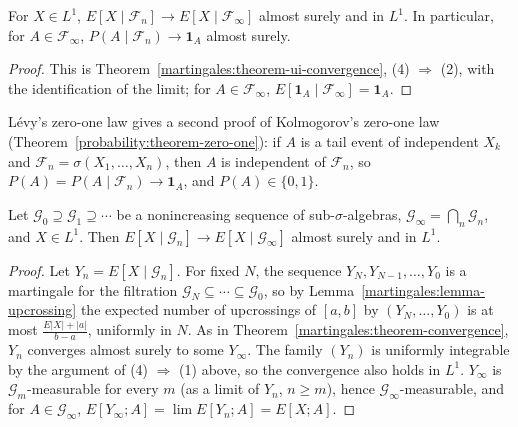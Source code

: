 \begin{corollary}\label{martingales:corollary-levy-upward}
For $X \in L^1$, $E[X \mid \mathcal{F}_n] \to E[X \mid \mathcal{F}_\infty]$ almost surely and in $L^1$. In particular, for $A \in \mathcal{F}_\infty$, $P(A \mid \mathcal{F}_n) \to \mathbf{1}_A$ almost surely.
\end{corollary}

\begin{proof}
This is Theorem~\ref{martingales:theorem-ui-convergence}, (4) $\Rightarrow$ (2), with the identification of the limit; for $A \in \mathcal{F}_\infty$, $E[\mathbf{1}_A \mid \mathcal{F}_\infty] = \mathbf{1}_A$.
\end{proof}

L\'evy's zero-one law gives a second proof of Kolmogorov's zero-one law (Theorem~\ref{probability:theorem-zero-one}): if $A$ is a tail event of independent $X_k$ and $\mathcal{F}_n = \sigma(X_1, \ldots, X_n)$, then $A$ is
independent of $\mathcal{F}_n$, so $P(A) = P(A \mid \mathcal{F}_n) \to \mathbf{1}_A$, and $P(A) \in \{0, 1\}$.

\begin{theorem}\label{martingales:theorem-backward}
Let $\mathcal{G}_0 \supseteq \mathcal{G}_1 \supseteq \cdots$ be a nonincreasing sequence of sub-$\sigma$-algebras, $\mathcal{G}_\infty = \bigcap_n\mathcal{G}_n$, and $X \in L^1$. Then $E[X \mid \mathcal{G}_n] \to E[X \mid \mathcal{G}_\infty]$
almost surely and in $L^1$.
\end{theorem}

\begin{proof}
Let $Y_n = E[X \mid \mathcal{G}_n]$. For fixed $N$, the sequence $Y_N, Y_{N-1}, \ldots, Y_0$ is a martingale for the filtration $\mathcal{G}_N \subseteq \cdots \subseteq \mathcal{G}_0$, so by Lemma~\ref{martingales:lemma-upcrossing} the expected
number of upcrossings of $[a, b]$ by $(Y_N, \ldots, Y_0)$ is at most $\frac{E|X| + |a|}{b - a}$, uniformly in $N$. As in Theorem~\ref{martingales:theorem-convergence}, $Y_n$ converges almost surely to some $Y_\infty$. The family $(Y_n)$
is uniformly integrable by the argument of (4) $\Rightarrow$ (1) above, so the convergence also holds in $L^1$. $Y_\infty$ is $\mathcal{G}_m$-measurable for every $m$ (as a limit of $Y_n$, $n \geq m$), hence
$\mathcal{G}_\infty$-measurable, and for $A \in \mathcal{G}_\infty$, $E[Y_\infty; A] = \lim E[Y_n; A] = E[X; A]$.
\end{proof}

